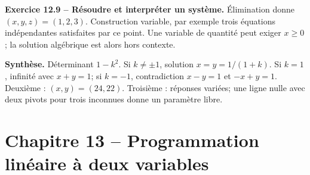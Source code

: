 \begin{answerbox}
\textbf{Exercice 12.9 -- Résoudre et interpréter un système.} Élimination donne $(x,y,z)=(1,2,3)$. Construction variable, par exemple trois équations indépendantes satisfaites par ce point. Une variable de quantité peut exiger $x\ge0$; la solution algébrique est alors hors contexte.\par
\medskip\textbf{Synthèse.} Déterminant $1-k^2$. Si $k\neq\pm1$, solution $x=y=1/(1+k)$. Si $k=1$, infinité avec $x+y=1$; si $k=-1$, contradiction $x-y=1$ et $-x+y=1$. Deuxième : $(x,y)=(24,22)$. Troisième : réponses variées; une ligne nulle avec deux pivots pour trois inconnues donne un paramètre libre.
\end{answerbox}
\chapter*{Chapitre 13 -- Programmation linéaire à deux variables}
